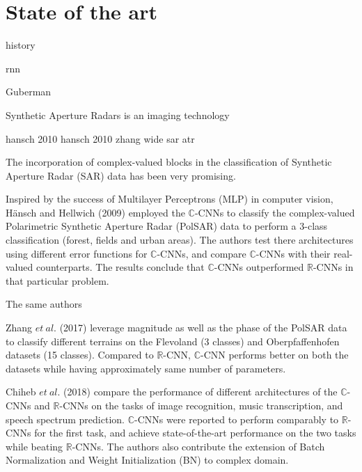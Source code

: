 \chapter{State of the art}\label{chap:comp}

history

rnn

Guberman

Synthetic Aperture Radars is an imaging technology

 
hansch 2010 hansch 2010 zhang wide sar atr

The incorporation of complex-valued blocks in the classification of Synthetic Aperture Radar (SAR) data has been very promising. 

Inspired by the success of Multilayer Perceptrons (MLP) in computer vision, H\"{a}nsch and Hellwich (2009) \cite{hansch2009classification} employed the $\mathbb{C}$-CNNs to classify the complex-valued Polarimetric Synthetic Aperture Radar (PolSAR) data to perform a 3-class classification (forest, fields and urban areas). The authors test there architectures using different error functions for $\mathbb{C}$-CNNs, and compare $\mathbb{C}$-CNNs with their real-valued counterparts. The results conclude that $\mathbb{C}$-CNNs outperformed $\mathbb{R}$-CNNs in that particular problem.




The same authors



Zhang $et \ al.$ (2017) \cite{polsarzhang2017complex} leverage magnitude as well as the phase of the PolSAR data to classify different terrains on the Flevoland (3 classes) and Oberpfaffenhofen datasets (15 classes). Compared to $\mathbb{R}$-CNN, $\mathbb{C}$-CNN performs better on both the datasets while having approximately same number of parameters.  



Chiheb $et \ al.$ (2018) \cite{trabelsi2018deep} compare the performance of different architectures of the $\mathbb{C}$-CNNs and $\mathbb{R}$-CNNs on the tasks of image recognition, music transcription, and speech spectrum prediction. $\mathbb{C}$-CNNs were reported to perform comparably to $\mathbb{R}$-CNNs for the first task, and achieve state-of-the-art performance on the two tasks while beating $\mathbb{R}$-CNNs. The authors also contribute the extension of Batch Normalization and Weight Initialization (BN) to complex domain. 